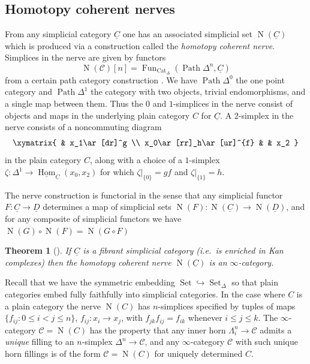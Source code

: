 \documentclass[reqno]{amsart}
\newtheorem{theorem}[lemma]{Theorem}
\theoremstyle{definition}
\newcommand{\msc}[1]{\mathscr{#1}}
\newcommand{\opn}[1]{\operatorname{#1}}
\newcommand{\uHom}{\underline{\operatorname{Hom}}}
\DeclareMathOperator{\Fun}{Fun}
\renewcommand{\1}{\mathbf{1}}
\begin{document}
\subsection{Homotopy coherent nerves}

From any simplicial category $\underline{C}$ one has an associated simplicial set $\opn{N}(\underline{C})$ which is produced via a construction called the \emph{homotopy coherent nerve}.  Simplices in the nerve are given by functors
\[
\opn{N}(\msc{C})[n]=\Fun_{\opn{Cat}_{\Delta}}(\opn{Path}\Delta^n,\underline{C})
\]
from a certain path category construction \cite[\href{https://kerodon.net/tag/00KN}{00KN}, \href{https://kerodon.net/tag/00KS}{00KS}]{kerodon}.  We have $\opn{Path}\Delta^0$ the one point category and $\opn{Path}\Delta^1$ the category with two objects, trivial endomorphisms, and a single map between them.  Thus the $0$ and $1$-simplices in the nerve consist of objects and maps in the underlying plain category $C$ for $\underline{C}$.  A $2$-simplex in the nerve consists of a noncommuting diagram
\[
\xymatrix{
 & x_1\ar[dr]^g \\
x_0\ar[rr]_h\ar[ur]^{f} & & x_2 
}
\]
in the plain category $C$, along with a choice of a $1$-simplex $\zeta:\Delta^1\to \uHom_{\underline{C}}(x_0,x_2)$ for which $\zeta|_{\{0\}}=gf$ and $\zeta|_{\{1\}}=h$.
\par

The nerve construction is functorial in the sense that any simplicial functor $F:\underline{C}\to \underline{D}$ determines a map of simplicial sets $\opn{N}(F):\opn{N}(\underline{C})\to \opn{N}(\underline{D})$, and for any composite of simplicial functors we have $\opn{N}(G)\circ\opn{N}(F)=\opn{N}(G\circ F)$ 

\begin{theorem}[\cite{cordierporter86}]
If $\underline{C}$ is a fibrant simplicial category (i.e.\ is enriched in Kan complexes) then the homotopy coherent nerve $\opn{N}(\underline{C})$ is an $\infty$-category.
\end{theorem}

Recall that we have the symmetric embedding $\opn{Set}\hookrightarrow \opn{Set}_{\Delta}$ so that plain categories embed fully faithfully into simplicial categories.  In the case where $C$ is a plain category the nerve $\opn{N}(C)$ has $n$-simplices specified by tuples of maps $\{f_{ij}:0\leq i<j\leq n\}$, $f_{ij}:x_i\to x_j$, with $f_{jk}f_{ij}=f_{ik}$ whenever $i\leq j\leq k$.  The $\infty$-category $\msc{C}=\opn{N}(C)$ has the property that any inner horn $\Lambda^n_i\to \msc{C}$ admits a \emph{unique} filling to an $n$-simplex $\Delta^n\to \msc{C}$, and any $\infty$-category $\msc{C}$ with such unique horn fillings is of the form $\msc{C}=\opn{N}(C)$ for uniquely determined $C$. 
\end{document}
